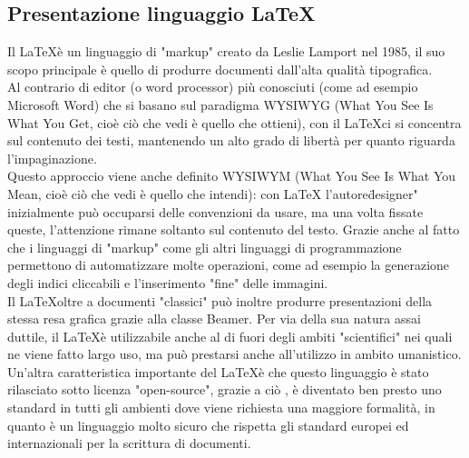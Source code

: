 \documentclass[hidelinks,12pt,a4paper]{article}
\begin{document}
\begin{flushleft}
			\subsection{Presentazione linguaggio \LaTeX}
			Il \LaTeX è un linguaggio di "markup" creato da Leslie Lamport nel 1985, il suo scopo principale è quello di produrre documenti dall'alta qualità tipografica.\\
			Al contrario di editor (o word processor) più conosciuti (come ad esempio Microsoft Word) che si basano sul paradigma WYSIWYG (What You See Is What You Get, cioè ciò che vedi è quello che ottieni), con il \LaTeX ci si concentra sul contenuto dei testi, mantenendo un alto grado di libertà per quanto riguarda l'impaginazione.\\
			Questo approccio viene anche definito WYSIWYM (What You See Is What You Mean, cioè ciò che vedi è quello che intendi): con LaTeX l'autore\"designer" inizialmente può occuparsi delle convenzioni da usare, ma una volta fissate queste, l'attenzione rimane soltanto sul contenuto del testo. Grazie anche al fatto che i linguaggi di "markup" come gli altri linguaggi di programmazione permettono di automatizzare molte operazioni, come ad esempio la generazione degli indici cliccabili e l'inserimento "fine" delle immagini. \\
			Il \LaTeX oltre a documenti "classici" può inoltre produrre presentazioni della stessa resa grafica grazie alla classe Beamer.
			Per via della sua natura assai duttile, il \LaTeX è utilizzabile anche al di fuori degli ambiti "scientifici"  nei quali ne viene fatto largo uso, ma può prestarsi anche all'utilizzo in ambito umanistico.\\
			Un'altra caratteristica importante del \LaTeX è che questo linguaggio è stato rilasciato sotto licenza "open-source", grazie a ciò , è diventato ben presto uno standard in tutti gli ambienti dove viene richiesta una maggiore formalità, in quanto è un linguaggio molto sicuro che rispetta gli standard europei ed internazionali per la scrittura di documenti.
			

\end{flushleft}
\end{document}
